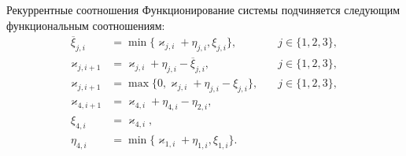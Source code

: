 \documentclass[10pt]{beamer}
\begin{document}
\begin{frame}{Рекуррентные соотношения}
Функционирование системы подчиняется следующим функциональным соотношениям:
\begin{equation}
\begin{aligned}
\overline{\xi}_{j,i}&=\min\{\varkappa_{j,i}+\eta_{j,i},\xi_{j,i}\}, \quad & j\in \{1,2,3\},\\
\varkappa_{j,i+1}&=\varkappa_{j,i}+\eta_{j,i}-\overline{\xi}_{j,i}, \quad & j\in \{1,2,3\},\\
\varkappa_{j,i+1}&=\max\{{0,\varkappa_{j,i}+\eta_{j,i}-\xi_{j,i}}\}, \quad & j\in \{1,2,3\},\\
\varkappa_{4,i+1}&=\varkappa_{4,i}+\eta_{4,i}-\eta_{2,i}, \quad &\\
\xi_{4,i} & = \varkappa_{4,i}, & \\
\eta_{4,i} & = \min\{ \varkappa_{1,i} + \eta_{1,i}, \xi_{1,i}\}.
\end{aligned}
\label{rekk}
\end{equation}
\end{frame}
\end{document}

